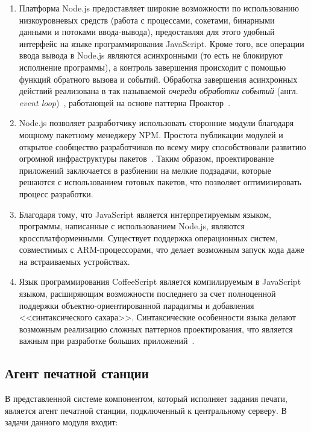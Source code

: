 \documentclass[a4paper,14pt,href,draft]{article}
\begin{document}
\begin{enumerate}
  \item Платформа Node.js предоставляет широкие возможности по использованию низкоуровневых средств (работа с
  процессами, сокетами, бинарными данными и потоками ввода-вывода), предоставляя для этого удобный интерфейс на
  языке программирования JavaScript. Кроме того, все операции ввода вывода в Node.js являются асинхронными
  (то есть не блокируют исполнение программы), а контроль завершения происходит с помощью функций обратного вызова
  и событий. Обработка завершения асинхронных действий реализована в так называемой \textit{очереди обработки событий}
  (англ. \textit{event loop})~\cite{UnderstandingEvenLoop}, работающей на основе паттерна Проактор~\cite{BoostProactor}.

  \item Node.js позволяет разработчику использовать сторонние модули благодаря мощному пакетному менеджеру NPM.
  Простота публикации модулей и открытое сообщество разработчиков по всему миру способствовали развитию огромной
  инфраструктуры пакетов~\cite{NPMGrowth}. Таким образом, проектирование приложений заключается в разбиении на
  мелкие подзадачи, которые решаются с использованием готовых пакетов, что позволяет оптимизировать процесс разработки.

  \item Благодаря тому, что JavaScript является интерпретируемым языком, программы, написанные с использованием
  Node.js, являются кроссплатформенными. Существует поддержка операционных систем, совместимых с ARM-процессорами,
  что делает возможным запуск кода даже на встраиваемых устройствах.

  \item Язык программирования CoffeeScript является компилируемым в \newline JavaScript языком, расширяющим
  возможности последнего за счет полноценной поддержки объектно-ориентированной парадигмы и добавления
  <<синтаксического сахара>>. Синтаксические особенности языка делают возможным реализацию сложных паттернов
  проектирования, что является важным при разработке больших приложений~\cite{CoffeeScriptCookbook}.
\end{enumerate}

\subsection{Агент печатной станции}
В представленной системе компонентом, который исполняет задания печати, является агент печатной станции, подключенный к
центральному серверу. В задачи данного модуля входит:
\end{document}
